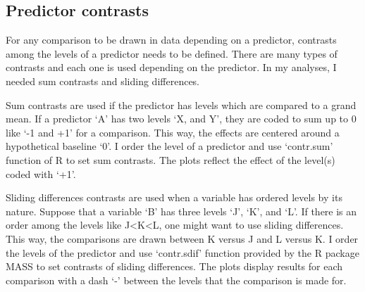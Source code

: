 \subsection{Predictor contrasts}

For any comparison to be drawn in data depending on a predictor, contrasts among the levels of a predictor needs to be defined. There are many types of contrasts and each one is used depending on the predictor. In my analyses, I needed sum contrasts and sliding differences.

Sum contrasts are used if the predictor has levels which are compared to a grand mean. If a predictor `A' has two levels `X, and Y', they are coded to sum up to 0 like `-1 and +1' for a comparison. This way, the effects are centered around a hypothetical baseline `0'. I order the level of a predictor and use `contr.sum' function of R to set sum contrasts. The plots reflect the effect of the level(s) coded with `+1'.

Sliding differences contrasts are used when a variable has ordered levels by its nature. Suppose that a variable `B' has three levels `J’, `K’, and `L’. If there is an order among the levels like J<K<L, one might want to use sliding differences. This way, the comparisons are drawn between K versus J and L versus K. I order the levels of the predictor and use `contr.sdif’ function provided by the R package MASS \citep{mass2002} to set contrasts of sliding differences. The plots display results for each comparison with a dash `-' between the levels that the comparison is made for. 




